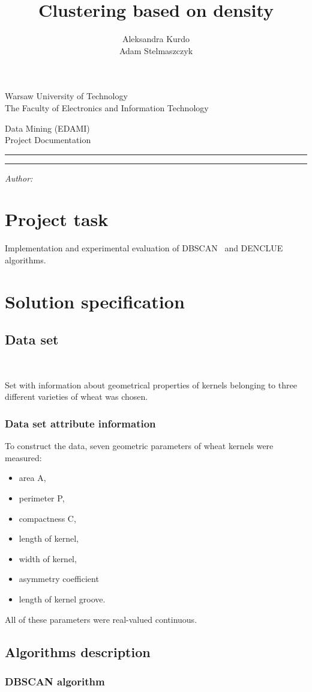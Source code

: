 \documentclass[12pt, a4paper, notitlepage, oneside]{article}
\title{Clustering based on density}
\author{Aleksandra Kurdo\\ Adam Stelmaszczyk}
\makeatletter
\newcommand{\linia}{\rule{\linewidth}{0.4mm}}
\renewcommand{\maketitle}{
\begin{titlepage}

    \vspace*{1cm}

    \begin{center}\small

    Warsaw University of Technology\\
    The Faculty of Electronics and Information Technology\\

    \end{center}

    \vspace{3cm}

     \begin{center}

    Data Mining (EDAMI)\\ Project Documentation

    \end{center}

    \noindent\linia

    \begin{center}

      \LARGE \textsc{\@title}

         \end{center}

     \noindent\linia

    \vspace{0.5cm}

    \begin{flushright}

    \begin{minipage}{5cm}

    \textit{\small Author:}\\

    \normalsize \textsc{\@author} \par

    \end{minipage}

    \vspace{4cm}
    
 

     \end{flushright}

    \vspace*{\stretch{6}}

    \begin{center}

    \@date

    \end{center}

  \end{titlepage}
}
\makeatother
\begin{document}
\maketitle


\onehalfspacing


\section*{Project task}
Implementation and experimental evaluation of DBSCAN~\cite{dbscan} and DENCLUE~\cite{denclue} algorithms. 

\section*{Solution specification}

\subsection*{Data set}~\cite{dataset}

Set with information about geometrical properties of kernels belonging to three different varieties of wheat was chosen.

\subsubsection*{Data set attribute information}


To construct the data, seven geometric parameters of wheat kernels were measured: 

\begin{itemize}
	\item area A, 
	\item perimeter P, 
	\item compactness C, 
	\item length of kernel, 
	\item width of kernel, 
	\item asymmetry coefficient 
	\item length of kernel groove. 
\end{itemize}

All of these parameters were real-valued continuous.


\subsection*{Algorithms description}
 
\subsubsection*{DBSCAN algorithm}
\end{document}
